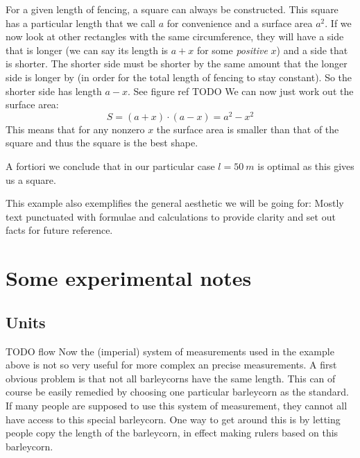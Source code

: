 \documentclass{report}
\begin{document}
\begin{example}
For a given length of fencing, a square can always be constructed. This square has a particular length that we call $a$ for convenience and a surface area $a^2$. If we now look at other rectangles with the same circumference, they will have a side that is longer (we can say its length is $a+x$ for some \emph{positive} $x$) and a side that is shorter. The shorter side must be shorter by the same amount that the longer side is longer by (in order for the total length of fencing to stay constant). So the shorter side has length $a-x$. See figure ref TODO We can now just work out the surface area:
\[ S = (a+x)\cdot (a-x) = a^2 - x^2 \]
This means that for any nonzero $x$ the surface area is smaller than that of the square and thus the square is the best shape.

A fortiori we conclude that in our particular case $l=\SI{50}{m}$ is optimal as this gives us a square.

\end{example}

This example also exemplifies the general aesthetic we will be going for: Mostly text punctuated with formulae and calculations to provide clarity and set out facts for future reference.

\part{Some experimental notes}
\setcounter{chapter}{0} %
\chapter{Units}
TODO flow
Now the (imperial) system of measurements used in the example above is not so very useful for more complex an precise measurements.
A first obvious problem is that not all barleycorns have the same length. This can of course be easily remedied by choosing one particular barleycorn as the standard.
If many people are supposed to use this system of measurement, they cannot all have access to this special barleycorn.
One way to get around this is by letting people copy the length of the barleycorn, in effect making rulers based on this barleycorn. 
\end{document}
